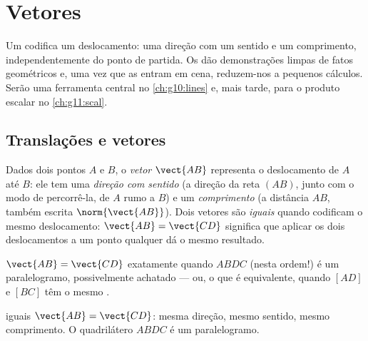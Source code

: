 \chapter{Vetores}\label{ch:g10:vectors}

Um  codifica um deslocamento: uma direção com um sentido e um
comprimento, independentemente do ponto de partida. Os  dão
demonstrações limpas de fatos geométricos e, uma vez que as 
entram em cena, reduzem-nos a pequenos cálculos. Serão uma ferramenta
central no \cref{ch:g10:lines} e, mais tarde, para o produto escalar no
\cref{ch:g11:scal}.

\section{Translações e vetores}

\begin{definition}[Vetor]\label{def:g10:vectors:vector}
Dados dois pontos $A$ e $B$, o \emph{vetor} $\vect{AB}$
representa o deslocamento de $A$ até $B$: ele tem uma \emph{direção com
sentido} (a direção da reta $(AB)$, junto com o modo de percorrê-la, de
$A$ rumo a $B$) e um \emph{comprimento} (a distância $AB$, também escrita
$\norm{\vect{AB}}$). Dois vetores são \emph{iguais} quando codificam o
mesmo deslocamento: $\vect{AB} = \vect{CD}$ significa que aplicar os dois
deslocamentos a um ponto qualquer dá o mesmo resultado.
\end{definition}

\begin{proposition}\label{prop:g10:vectors:parallelogram}
$\vect{AB} = \vect{CD}$ exatamente quando $ABDC$ (nesta ordem!) é um
paralelogramo, possivelmente achatado --- ou, o que é equivalente, quando
$[AD]$ e $[BC]$ têm o mesmo .
\end{proposition}
\admitted

\begin{omfigure}

{\small {} iguais $\vect{AB} = \vect{CD}$: mesma direção, mesmo
sentido, mesmo comprimento. O quadrilátero $ABDC$ é um paralelogramo.}
\end{omfigure}


